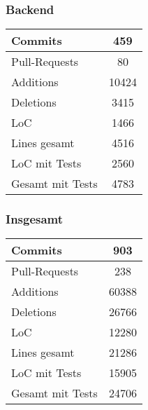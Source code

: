 \begin{frame}\frametitle{Backend}
    \begin{minipage}{.3\textwidth}
        \begin{tabular}{l|c}
            Commits & 459 \\
            \hline
            Pull-Requests & 80 \\
            \hline
            Additions & 10424\\
            \hline
            Deletions & 3415 \\
            \hline
            LoC & 1466 \\
            \hline
            Lines gesamt & 4516 \\
            \hline
            LoC mit Tests & 2560 \\
            \hline
            Gesamt mit Tests & 4783
        \end{tabular}
    \end{minipage}
    \begin{minipage}{.69\textwidth}
    \end{minipage}
\end{frame}

\begin{frame}\frametitle{Insgesamt}
    \centering
    \begin{tabular}{l|c}
        Commits & 903 \\
        \hline
        Pull-Requests & 238 \\
        \hline
        Additions & 60388\\
        \hline
        Deletions & 26766 \\
        \hline
        LoC & 12280 \\
        \hline
        Lines gesamt & 21286 \\
        \hline
        LoC mit Tests & 15905 \\
        \hline
        Gesamt mit Tests & 24706
    \end{tabular}
\end{frame}